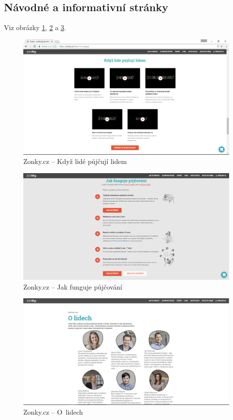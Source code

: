 \subsection{Návodné a informativní stránky}
Viz obrázky \ref{fig:zonky:info}, \ref{fig:zonky:info2} a \ref{fig:zonky:info3}.
\begin{figure}[h]
    \centering
    \includegraphics[width=1.0\textwidth]{media/zonky/info.png}
    \caption{Zonky.cz -- Když lidé půjčují lidem}
    \label{fig:zonky:info}
\end{figure}
\begin{figure}[h]
    \centering
    \includegraphics[width=1.0\textwidth]{media/zonky/info2.png}
    \caption{Zonky.cz -- Jak funguje půjčování}
    \label{fig:zonky:info2}
\end{figure}
\begin{figure}[h]
    \centering
    \includegraphics[width=1.0\textwidth]{media/zonky/info3.png}
    \caption{Zonky.cz -- O~lidech}
    \label{fig:zonky:info3}
\end{figure}
